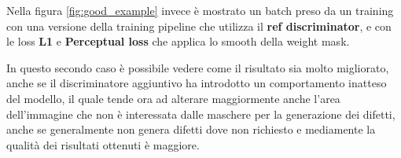 Nella figura \ref{fig:good_example} invece è mostrato un batch preso da un training con una versione della training pipeline che utilizza il \textbf{ref discriminator},
e con le loss \textbf{L1} e \textbf{Perceptual loss} che applica lo smooth della weight mask.

In questo secondo caso è possibile vedere come il risultato sia molto migliorato, anche se il discriminatore aggiuntivo ha introdotto 
un comportamento inatteso del modello, il quale tende ora ad alterare maggiormente anche l'area dell'immagine che non è interessata 
dalle maschere per la generazione dei difetti, anche se generalmente non genera difetti dove non richiesto e mediamente la qualità dei risultati ottenuti
è maggiore.

\begin{figure}[htpb]
    \centering
    \begin{subfigure}[b]{0.3\textwidth}

\end{subfigure}
\end{figure}
